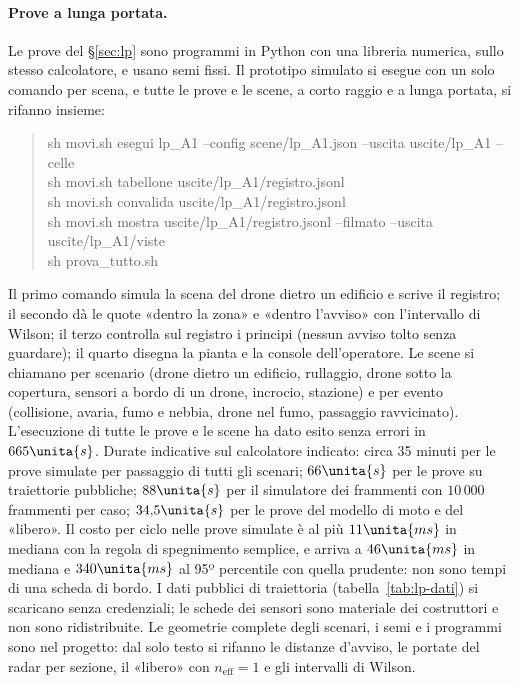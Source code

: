 \paragraph{Prove a lunga portata.} Le prove del \S\ref{sec:lp} sono programmi in Python con una libreria numerica, sullo stesso calcolatore, e usano semi fissi. Il prototipo simulato si esegue con un solo comando per scena, e tutte le prove e le scene, a corto raggio e a lunga portata, si rifanno insieme:
\begin{quote}\small\ttfamily
sh movi.sh esegui lp\_A1 --config scene/lp\_A1.json --uscita uscite/lp\_A1 --celle\\
sh movi.sh tabellone uscite/lp\_A1/registro.jsonl\\
sh movi.sh convalida uscite/lp\_A1/registro.jsonl\\
sh movi.sh mostra uscite/lp\_A1/registro.jsonl --filmato --uscita uscite/lp\_A1/viste\\
sh prova\_tutto.sh
\end{quote}
Il primo comando simula la scena del drone dietro un edificio e scrive il registro; il secondo dà le quote «dentro la zona» e «dentro l'avviso» con l'intervallo di Wilson; il terzo controlla sul registro i principi (nessun avviso tolto senza guardare); il quarto disegna la pianta e la console dell'operatore. Le scene si chiamano per scenario (drone dietro un edificio, rullaggio, drone sotto la copertura, sensori a bordo di un drone, incrocio, stazione) e per evento (collisione, avaria, fumo e nebbia, drone nel fumo, passaggio ravvicinato). L'esecuzione di tutte le prove e le scene ha dato esito senza errori in $665\unita{s}$. Durate indicative sul calcolatore indicato: circa 35 minuti per le prove simulate per passaggio di tutti gli scenari; $66\unita{s}$ per le prove su traiettorie pubbliche; $88\unita{s}$ per il simulatore dei frammenti con $10\,000$ frammenti per caso; $34{,}5\unita{s}$ per le prove del modello di moto e del «libero». Il costo per ciclo nelle prove simulate è al più $11\unita{ms}$ in mediana con la regola di spegnimento semplice, e arriva a $46\unita{ms}$ in mediana e $340\unita{ms}$ al 95º percentile con quella prudente: non sono tempi di una scheda di bordo. I dati pubblici di traiettoria (tabella~\ref{tab:lp-dati}) si scaricano senza credenziali; le schede dei sensori sono materiale dei costruttori e non sono ridistribuite. Le geometrie complete degli scenari, i semi e i programmi sono nel progetto: dal solo testo si rifanno le distanze d'avviso, le portate del radar per sezione, il «libero» con $n_{\mathrm{eff}}=1$ e gli intervalli di Wilson.
